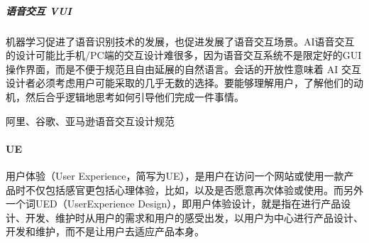 \documentclass[letterpaper,10pt,english]{sphinxmanual}
\begin{document}
\subparagraph{语音交互 VUI}
\label{\detokenize{chapter_knowledge/IXD_design:vui}}
机器学习促进了语音识别技术的发展，也促进发展了语音交互场景。AI语音交互的设计可能比手机/PC端的交互设计难很多，因为语音交互系统不是限定好的GUI操作界面，而是不便于规范且自由延展的自然语言。会话的开放性意味着
AI
交互设计者必须考虑用户可能采取的几乎无数的选择。要能够理解用户，了解他们的动机，然后合乎逻辑地思考如何引导他们完成一件事情。

阿里、谷歌、亚马逊语音交互设计规范%
\begin{footnote}[631]\sphinxAtStartFootnote
{}
%
\end{footnote}


\paragraph{UE}
\label{\detokenize{chapter_knowledge/IXD_design:ue}}
用户体验（User
Experience，简写为UE），是用户在访问一个网站或使用一款产品时不仅包括感官更包括心理体验，比如，以及是否愿意再次体验或使用。而另外一个词UED（User\sphinxhyphen{}Experience
Design），即用户体验设计，就是指在进行产品设计、开发、维护时从用户的需求和用户的感受出发，以用户为中心进行产品设计、开发和维护，而不是让用户去适应产品本身。%
\begin{footnote}[632]\sphinxAtStartFootnote
{}
%
\end{footnote}
\end{document}
